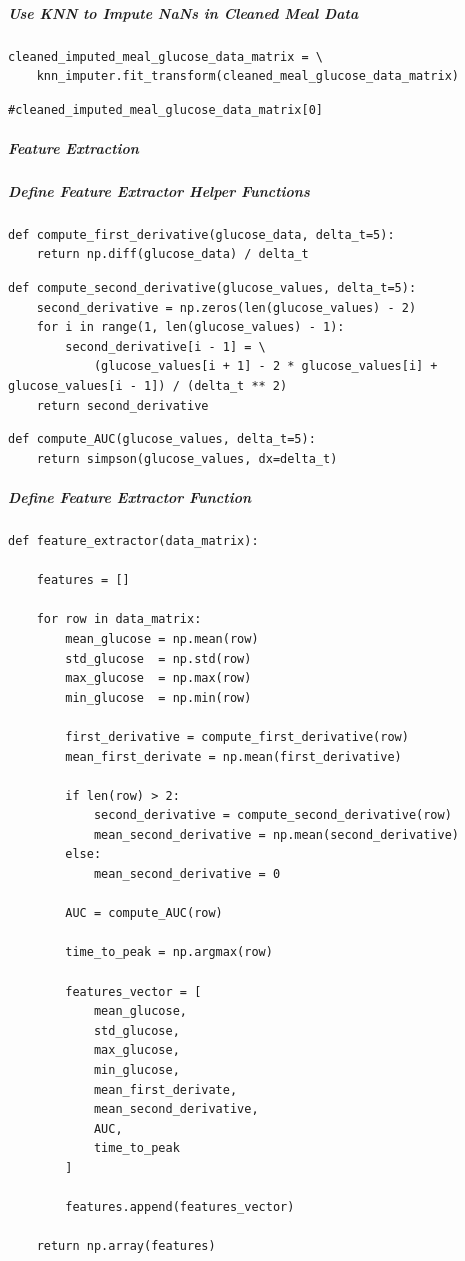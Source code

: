 \subparagraph{Use KNN to Impute NaNs in Cleaned Meal Data}

\begin{verbatim}
cleaned_imputed_meal_glucose_data_matrix = \
    knn_imputer.fit_transform(cleaned_meal_glucose_data_matrix)
\end{verbatim}

\begin{verbatim}
#cleaned_imputed_meal_glucose_data_matrix[0]
\end{verbatim}

\subparagraph{Feature Extraction}

\subparagraph{Define Feature Extractor Helper Functions}

\begin{verbatim}
def compute_first_derivative(glucose_data, delta_t=5):
    return np.diff(glucose_data) / delta_t
\end{verbatim}

\begin{verbatim}
def compute_second_derivative(glucose_values, delta_t=5):
    second_derivative = np.zeros(len(glucose_values) - 2)
    for i in range(1, len(glucose_values) - 1):
        second_derivative[i - 1] = \
            (glucose_values[i + 1] - 2 * glucose_values[i] + glucose_values[i - 1]) / (delta_t ** 2)
    return second_derivative
\end{verbatim}

\begin{verbatim}
def compute_AUC(glucose_values, delta_t=5):
    return simpson(glucose_values, dx=delta_t)
\end{verbatim}

\subparagraph{Define Feature Extractor Function}

\begin{verbatim}
def feature_extractor(data_matrix):

    features = []

    for row in data_matrix:
        mean_glucose = np.mean(row)
        std_glucose  = np.std(row)
        max_glucose  = np.max(row)
        min_glucose  = np.min(row)
        
        first_derivative = compute_first_derivative(row)
        mean_first_derivate = np.mean(first_derivative)

        if len(row) > 2:
            second_derivative = compute_second_derivative(row)
            mean_second_derivative = np.mean(second_derivative)
        else:
            mean_second_derivative = 0

        AUC = compute_AUC(row)

        time_to_peak = np.argmax(row)

        features_vector = [
            mean_glucose,
            std_glucose,
            max_glucose,
            min_glucose,
            mean_first_derivate,
            mean_second_derivative,
            AUC,
            time_to_peak
        ]

        features.append(features_vector)
    
    return np.array(features)
\end{verbatim}

